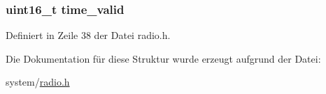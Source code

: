 \subsubsection[{time\+\_\+valid}]{\setlength{\rightskip}{0pt plus 5cm}uint16\+\_\+t time\+\_\+valid}\label{structradio__status_a3d873f4f8e8dd5c6dcc0c930a44c3449}


Definiert in Zeile 38 der Datei radio.\+h.



Die Dokumentation für diese Struktur wurde erzeugt aufgrund der Datei\+:\begin{DoxyCompactItemize}
\item 
system/\hyperlink{radio_8h}{radio.\+h}\end{DoxyCompactItemize}
